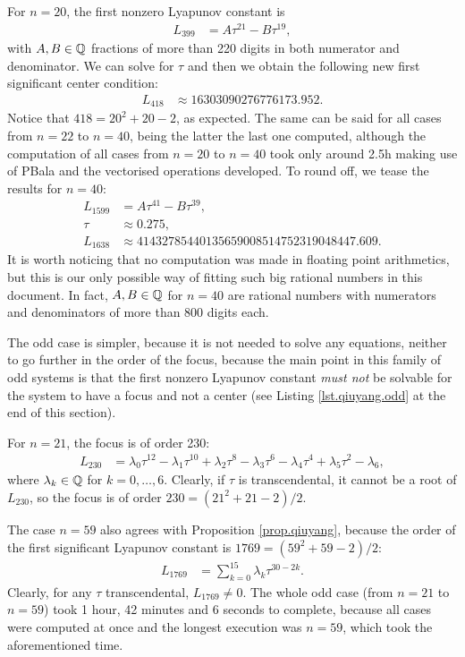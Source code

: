 For $n=20$, the first nonzero Lyapunov constant is
\begin{align*}
L_{399} &= A \tau^{21} - B \tau^{19},
\end{align*}
with $A,B\in\mathbb{Q}$ fractions of more than 220 digits in both numerator and denominator. We can solve for $\tau$ and then we obtain the following new first significant center condition:
\begin{align*}
L_{418} &\approx 16303090276776173.952.
\end{align*}	
Notice that $418=20^2+20-2$, as expected. The same can be said for all cases from $n=22$ to $n=40$, being the latter the last one computed, although the computation of all cases from $n=20$ to $n=40$ took only around 2.5h making use of PBala and the vectorised operations developed. To round off, we tease the results for $n=40$:
\begin{align*}
L_{1599} &= A \tau^{41} - B \tau^{39},\\
\tau &\approx 0.275,\\
L_{1638} &\approx 41432785440135659008514752319048447.609.
\end{align*}
It is worth noticing that no computation was made in floating point arithmetics, but this is our only possible way of fitting such big rational numbers in this document. In fact, $A,B\in\mathbb{Q}$ for $n=40$ are rational numbers with numerators and denominators of more than 800 digits each.


The odd case is simpler, because it is not needed to solve any equations, neither to go further in the order of the focus, because the main point in this family of odd systems is that the first nonzero Lyapunov constant \emph{must not} be solvable for the system to have a focus and not a center (see Listing \ref{lst.qiuyang.odd} at the end of this section).

For $n=21$, the focus is of order 230:
\begin{align*}
L_{230} &= \lambda_0 \tau^{12}-\lambda_1\tau^{10}+\lambda_2\tau^8-\lambda_3\tau^6- \lambda_4\tau^4 + \lambda_5\tau^2-\lambda_6,
\end{align*}
where $\lambda_k\in\mathbb{Q}$ for $k=0,\dots,6$. Clearly, if $\tau$ is transcendental, it cannot be a root of $L_{230}$, so the focus is of order $230=(21^2+21-2)/2$.

The case $n=59$ also agrees with Proposition \ref{prop.qiuyang}, because the order of the first significant Lyapunov constant is $1769=(59^2+59-2)/2$:
\begin{align*}
L_{1769} &= \sum_{k=0}^15 \lambda_k \tau^{30-2k}.
\end{align*}
Clearly, for any $\tau$ transcendental, $L_{1769}\ne0$. The whole odd case (from $n=21$ to $n=59$) took 1 hour, 42 minutes and 6 seconds to complete, because all cases were computed at once and the longest execution was $n=59$, which took the aforementioned time.


